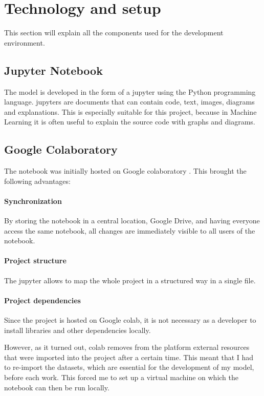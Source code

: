 \section{Technology and setup}
\label{chap:tech}
This section will explain all the components used for the development environment. 
\subsection{Jupyter Notebook}
The model is developed in the form of a \gls{jupyter} \cite{noauthor_project_nodate} using the Python programming language. \gls{jupyter}s are documents that can contain code, text, images, diagrams and explanations. This is especially suitable for this project, because in Machine Learning it is often useful to explain the source code with graphs and diagrams.

\subsection{Google Colaboratory}
The notebook was initially hosted on Google \gls{colab}oratory \cite{colab}. This brought the following advantages:
\paragraph{Synchronization} 
By storing the notebook in a central location, Google Drive, and having everyone access the same notebook, all changes are immediately visible to all users of the notebook.
\paragraph{Project structure} 
The \gls{jupyter} allows to map the whole project in a structured way in a single file. 
\paragraph{Project dependencies}
Since the project is hosted on Google \gls{colab}, it is not necessary as a developer to install libraries and other dependencies locally.

However, as it turned out, \gls{colab} removes from the platform external resources that were imported into the project after a certain time. This meant that I had to re-import the datasets, which are essential for the development of my model, before each work. This forced me to set up a \gls{virtual machine} on which the notebook can then be run locally.

